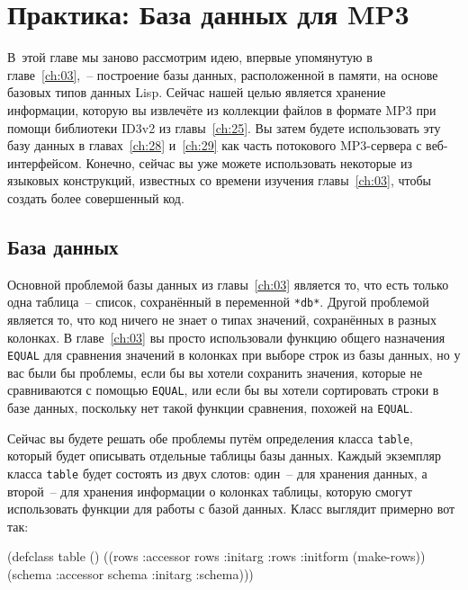 \chapter{Практика: База данных для MP3}
\label{ch:27}

\thispagestyle{empty}

В~этой главе мы заново рассмотрим идею, впервые упомянутую в главе~\ref{ch:03},~--
пос\-трое\-ние базы данных, расположенной в памяти, на основе базовых типов данных Lisp.
Сейчас нашей целью является хранение информации, которую вы извлечёте из коллекции файлов
в формате MP3 при помощи библиотеки ID3v2 из главы~\ref{ch:25}.  Вы затем будете
использовать эту базу данных в главах~\ref{ch:28} и~\ref{ch:29} как часть потокового
MP3-сервера с веб-интерфейсом.  Конечно, сейчас вы уже можете использовать некоторые из
языковых конструкций, известных со времени изучения главы~\ref{ch:03}, чтобы создать более
совершенный код.

\section{База данных}

Основной проблемой базы данных из главы~\ref{ch:03} является то, что есть только одна
таблица~-- список, сохранённый в переменной \lstinline{*db*}.  Другой проблемой является то,
что код ничего не знает о типах значений, сохранённых в разных колонках.  В
главе~\ref{ch:03} вы просто использовали функцию общего назначения \lstinline{EQUAL} для
сравнения значений в колонках при выборе строк из базы данных, но у вас были бы проблемы,
если бы вы хотели сохранить значения, которые не сравниваются с помощью \lstinline{EQUAL},
или если бы вы хотели сортировать строки в базе данных, поскольку нет такой функции
сравнения, похожей на \lstinline{EQUAL}.

Сейчас вы будете решать обе проблемы путём определения класса \lstinline{table}, который будет
описывать отдельные таблицы базы данных.  Каждый экземпляр класса \lstinline{table} будет
состоять из двух слотов: один~-- для хранения данных, а второй~-- для хранения информации о
колонках таблицы, которую смогут использовать функции для работы с базой данных.  Класс
выглядит примерно вот так:

\begin{myverb}
(defclass table ()
  ((rows   :accessor rows   :initarg :rows :initform (make-rows))
   (schema :accessor schema :initarg :schema)))
\end{myverb}

